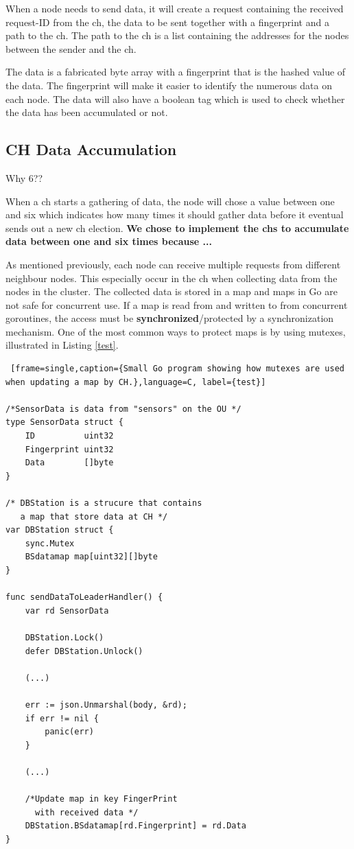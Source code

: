 \documentclass[USenglish]{uit-thesis}
\begin{document}
When a node needs to send data, it will create a request containing the received request-ID from the \gls{ch}, the data to be sent together with a fingerprint and a path to the \gls{ch}. The path to the \gls{ch} is a list containing the addresses for the nodes between the sender and the \gls{ch}.


The data is a fabricated byte array with a fingerprint that is the hashed value of the data. The fingerprint will make it easier to identify the numerous data on each node. The data will also have a boolean tag which is used to check whether the data has been accumulated or not. 

\subsection{CH Data Accumulation}
Why 6??
 
When a \gls{ch} starts a gathering of data, the node will chose a value between one and six which indicates how many times it should gather data before it eventual sends out a new \gls{ch} election. \textbf{We chose to implement the \gls{ch}s to accumulate data between one and six times because ...}


As mentioned previously, each node can receive multiple requests from different neighbour nodes.
This especially occur in the \gls{ch} when collecting data from the nodes in the cluster. The collected data is stored in a map and maps in Go are not safe for concurrent use. If a map is read from and written to from concurrent goroutines, the access must be \textbf{synchronized}/protected by a synchronization mechanism. One of the most common ways to protect maps is by using mutexes, illustrated in Listing \ref{test}.

\newpage

\begin{lstlisting} [frame=single,caption={Small Go program showing how mutexes are used when updating a map by CH.},language=C, label={test}]

/*SensorData is data from "sensors" on the OU */
type SensorData struct {
	ID          uint32
	Fingerprint uint32
	Data        []byte
}

/* DBStation is a strucure that contains 
   a map that store data at CH */
var DBStation struct {
	sync.Mutex
	BSdatamap map[uint32][]byte
}

func sendDataToLeaderHandler() {
	var rd SensorData
	
	DBStation.Lock()
	defer DBStation.Unlock()
	
	(...)
	
	err := json.Unmarshal(body, &rd); 
	if err != nil {
		panic(err)
	}
	
	(...)
	
	/*Update map in key FingerPrint
	  with received data */
	DBStation.BSdatamap[rd.Fingerprint] = rd.Data
}
\end{lstlisting}
\end{document}
